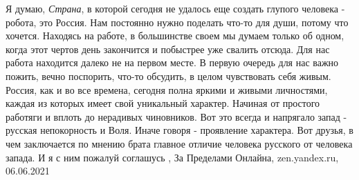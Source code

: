 Я думаю, \emph{Страна}, в которой сегодня не удалось еще создать глупого
человека - робота, это Россия. Нам постоянно нужно поделать что-то для души,
потому что хочется. Находясь на работе, в большинстве своем мы думаем только об
одном, когда этот чертов день закончится и побыстрее уже свалить отсюда. Для
нас работа находится далеко не на первом месте. В первую очередь для нас важно
пожить, вечно поспорить, что-то обсудить, в целом чувствовать себя живым.
Россия, как и во все времена, сегодня полна яркими и живыми личностями, каждая
из которых имеет свой уникальный характер. Начиная от простого работяги и
вплоть до нерадивых чиновников. Вот это всегда и напрягало запад - русская
непокорность и Воля. Иначе говоря - проявление характера.  Вот друзья, в чем
заключается по мнению брата главное отличие человека русского от человека
запада. И я с ним пожалуй соглашусь
, 
За Пределами Онлайна, zen.yandex.ru, 06.06.2021

